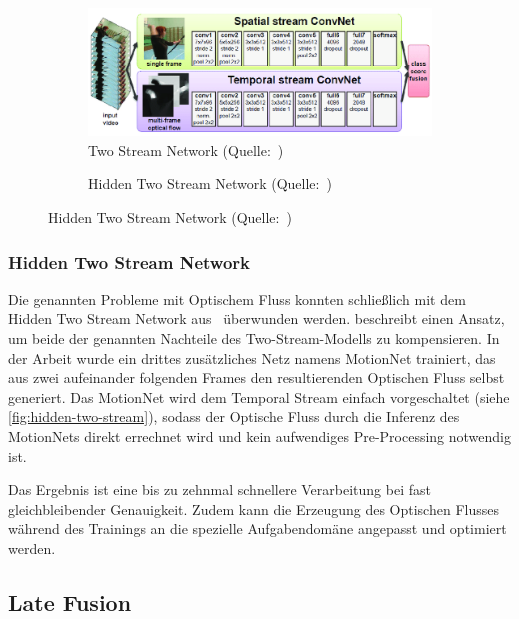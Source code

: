 \begin{figure}
    \centering
    \begin{subfigure}[b]{.5\textwidth}
        \centering
        \includegraphics[width=.95\linewidth]{img/03_Simonyan14}
        \caption{Two Stream Network (Quelle:~\cite{Simonyan14})}
        \label{fig:two-stream}
    \end{subfigure}%
    \begin{subfigure}[b]{.5\textwidth}
        \centering
        \caption{Hidden Two Stream Network (Quelle:~\cite{Zhu17})}
        \label{fig:hidden-two-stream}
    \end{subfigure}
\end{figure}

\subsubsection{Hidden Two Stream Network}

Die genannten Probleme mit Optischem Fluss konnten schließlich mit dem Hidden Two Stream Network aus~\cite{Zhu17} überwunden werden.
\cite{Zhu17} beschreibt einen Ansatz, um beide der genannten Nachteile des Two-Stream-Modells zu kompensieren.
In der Arbeit wurde ein drittes zusätzliches Netz namens MotionNet trainiert, das aus zwei aufeinander folgenden Frames den resultierenden Optischen Fluss selbst generiert.
Das MotionNet wird dem Temporal Stream einfach vorgeschaltet (siehe \autoref{fig:hidden-two-stream}), sodass der Optische Fluss durch die Inferenz des MotionNets direkt errechnet wird und kein aufwendiges Pre-Processing notwendig ist.

Das Ergebnis ist eine bis zu zehnmal schnellere Verarbeitung bei fast gleichbleibender Genauigkeit.
Zudem kann die Erzeugung des Optischen Flusses während des Trainings an die spezielle Aufgabendomäne angepasst und optimiert werden.

\subsection{Late Fusion}
\label{subsec:late-fusion}

